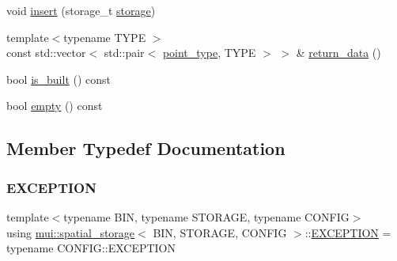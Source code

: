 \begin{DoxyCompactItemize}
\item 
void \hyperlink{classmui_1_1spatial__storage_aabb3121647617faf8da57ca266b9a7d0}{insert} (storage\+\_\+t \hyperlink{structmui_1_1storage}{storage})
\item 
{\footnotesize template$<$typename T\+Y\+PE $>$ }\\const std\+::vector$<$ std\+::pair$<$ \hyperlink{classmui_1_1spatial__storage_a29c9b70a3becee947f2ffa55264d8fde}{point\+\_\+type}, T\+Y\+PE $>$ $>$ \& \hyperlink{classmui_1_1spatial__storage_af19e719b90b4b4e70177ab4c371879a4}{return\+\_\+data} ()
\item 
bool \hyperlink{classmui_1_1spatial__storage_a3daf69eb1e3d9b2aeeff81d29fbdc2d7}{is\+\_\+built} () const
\item 
bool \hyperlink{classmui_1_1spatial__storage_ab45a2e3749d60948fb0bf5854c79db81}{empty} () const
\end{DoxyCompactItemize}


\subsection{Member Typedef Documentation}
\mbox{\label{classmui_1_1spatial__storage_a46075f28c96905aa1bc13a1690c1fcaf}} 
\subsubsection{\texorpdfstring{E\+X\+C\+E\+P\+T\+I\+ON}{EXCEPTION}}
{\footnotesize\ttfamily template$<$typename B\+IN, typename S\+T\+O\+R\+A\+GE, typename C\+O\+N\+F\+IG$>$ \\
using \hyperlink{classmui_1_1spatial__storage}{mui\+::spatial\+\_\+storage}$<$ B\+IN, S\+T\+O\+R\+A\+GE, C\+O\+N\+F\+IG $>$\+::\hyperlink{classmui_1_1spatial__storage_a46075f28c96905aa1bc13a1690c1fcaf}{E\+X\+C\+E\+P\+T\+I\+ON} =  typename C\+O\+N\+F\+I\+G\+::\+E\+X\+C\+E\+P\+T\+I\+ON}

\mbox{\label{classmui_1_1spatial__storage_a29c9b70a3becee947f2ffa55264d8fde}} 
